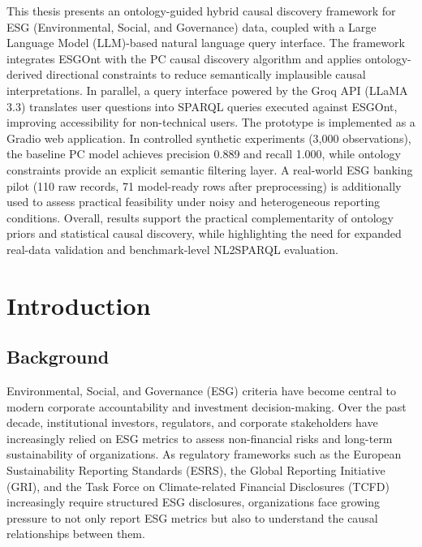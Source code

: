 \documentclass[a4paper,11pt,oneside]{article}
\begin{document}
This thesis presents an ontology-guided hybrid causal discovery framework for ESG (Environmental, Social, and Governance) data, coupled with a Large Language Model (LLM)-based natural language query interface. The framework integrates ESGOnt with the PC causal discovery algorithm and applies ontology-derived directional constraints to reduce semantically implausible causal interpretations. In parallel, a query interface powered by the Groq API (LLaMA 3.3) translates user questions into SPARQL queries executed against ESGOnt, improving accessibility for non-technical users. The prototype is implemented as a Gradio web application. In controlled synthetic experiments (3,000 observations), the baseline PC model achieves precision 0.889 and recall 1.000, while ontology constraints provide an explicit semantic filtering layer. A real-world ESG banking pilot (110 raw records, 71 model-ready rows after preprocessing) is additionally used to assess practical feasibility under noisy and heterogeneous reporting conditions. Overall, results support the practical complementarity of ontology priors and statistical causal discovery, while highlighting the need for expanded real-data validation and benchmark-level NL2SPARQL evaluation.

  \newpage
  \tableofcontents

  \clearpage

\section{Introduction}

\subsection{Background}

Environmental, Social, and Governance (ESG) criteria have become central to modern corporate accountability and investment decision-making. Over the past decade, institutional investors, regulators, and corporate stakeholders have increasingly relied on ESG metrics to assess non-financial risks and long-term sustainability of organizations. As regulatory frameworks such as the European Sustainability Reporting Standards (ESRS), the Global Reporting Initiative (GRI), and the Task Force on Climate-related Financial Disclosures (TCFD) increasingly require structured ESG disclosures, organizations face growing pressure to not only report ESG metrics but also to understand the causal relationships between them.
\end{document}
